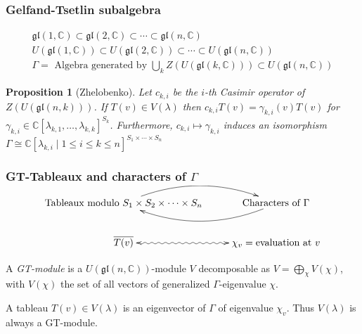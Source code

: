 \documentclass[smaller,usepdftitle=false]{beamer}
\newcommand\CC{\mathbb C}
\newcommand\gl{\mathfrak{gl}}
\newtheorem*{Proposition}{Proposition}
\begin{document}
\begin{frame}
\frametitle{Gelfand-Tsetlin subalgebra}

\begin{gather*}
\gl(1,\CC) \subset \gl(2,\CC) \subset \cdots \subset \gl(n,\CC) \\
U(\gl(1,\CC)) \subset U(\gl(2,\CC)) \subset \cdots \subset U(\gl(n,\CC)) \\
\Gamma = \mbox{ Algebra generated by } \bigcup_k Z(U(\gl(k,\CC))) 
\subset U(\gl(n,\CC))
\end{gather*}
\pause
\vspace{-.5cm}
\begin{Proposition}[Zhelobenko]
Let $c_{k,i}$ be the $i$-th Casimir operator of $Z(U(\gl(n,k)))$. If $T(v) 
\in V(\lambda)$ then $c_{k,i} T(v) = \gamma_{k,i}(v) T(v)$ for $\gamma_{k,i} 
\in \CC[\lambda_{k,1}, \ldots, \lambda_{k,k}]^{S_k}$. Furthermore, $c_{k,i}
\mapsto \gamma_{k,i}$ induces an isomorphism $\Gamma \cong \CC[\lambda_{k,i}
\mid 1 \leq i \leq k \leq n]^{S_1 \times \cdots \times S_n}$
\end{Proposition}
\end{frame}

\begin{frame}
\frametitle{GT-Tableaux and characters of $\Gamma$}
\begin{align*}
\xymatrix{
	\mbox{Tableaux modulo } S_1 \times S_2 \times \cdots \times S_n
		\ar@/^18pt/[r] & \mbox{Characters of } \Gamma \ar@/^18pt/[l] \\
	\overline{T(v)} \ar@{<~>}[r]
		& \chi_v = \mbox{evaluation at } v
}
\end{align*}

\pause 

\begin{Definition}
A \emph{GT-module} is a $U(\gl(n,\CC))$-module $V$ decomposable as $V = 
\bigoplus_\chi V(\chi)$, with $V(\chi)$ the set of all vectors of
generalized $\Gamma$-eigenvalue $\chi$.
\end{Definition}

A tableau $T(v) \in V(\lambda)$ is an eigenvector of $\Gamma$ of eigenvalue 
$\chi_v$. Thus $V(\lambda)$ is always a GT-module.
\end{frame}
\end{document}
